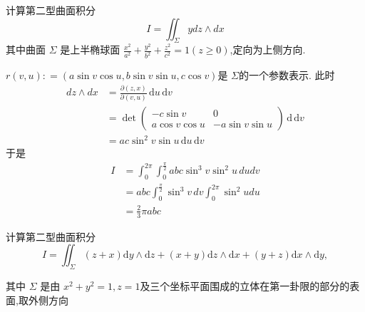 \documentclass[lang=cn,12pt,color=green,fontset=none,thmcnt=section]{elegantbook}
\begin{document}
\begin{exercise}

    计算第二型曲面积分 $$
    I= \iint_{\Sigma} y dz \wedge   dx
    $$其中曲面 $\Sigma  $   是上半椭球面 $ \frac{x^{2}}{a^{2}}+  \frac{y^{2}}{b^{2}}+  \frac{z^{2}}{c^{2}} = 1 \left(  z \ge   0 \right) $,定向为上侧方向.
\end{exercise}

\begin{solution}

    $r\left( v,u \right) : = \left( a\sin v \cos u , b \sin v \sin u , c \cos v      \right) $是 $ \Sigma   $的一个参数表示.
    此时 $$
\begin{aligned}
    dz \wedge  dx & =  \frac{\partial \left( z,x \right) }{\partial    \left( v,u \right) } \,\mathrm{d}u \,\mathrm{d}v\\
    & = \det \begin{pmatrix} 
        -c  \sin v   & 0   \\ 
        a \cos v \cos u    & -a \sin v \sin u 
    \end{pmatrix}  \,\mathrm{d} \,\mathrm{d}v
   \\ & = ac \sin^{2}v\sin  u \,\mathrm{d}u \,\mathrm{d}v
\end{aligned} 
    $$
    于是 $$
  \begin{aligned}
    I & = \int_{0}^{2\pi}\int_{0}^{\frac{\pi}{2}} abc \sin^{3} v  \sin ^{2}u \, du dv
\\        &    = abc \int_{0}^{\frac{\pi}{2}} \sin^{3}v\,dv \int_{0}^{2\pi} \sin ^{2}u du
\\ & = \frac{2}{3}\pi abc
  \end{aligned}
    $$
\end{solution}

\begin{exercise}
    计算第二型曲面积分 $$I=\iint_{\Sigma}(z+x)\mathrm{d}y\wedge\mathrm{d}z+(x+y)\mathrm{d}z\wedge\mathrm{d}x+(y+z)\mathrm{d}x\wedge\mathrm{d}y,$$

    其中 $\Sigma    $   是由 $x^{2}+ y^{2}=1,z=1$及三个坐标平面围成的立体在第一卦限的部分的表面,取外侧方向

\end{exercise}
 
\end{document}
